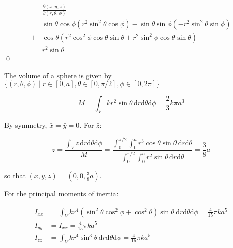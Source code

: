 \documentclass[12pt]{article}
\begin{document}




\begin{equation}
\begin{split}
    &\frac{\partial (x, y, z)}{\partial (r, \theta, \phi)} \\
    =& \sin{\theta} \cos{\phi} (r^{2} \sin^{2}\theta \cos{\phi}) - \sin{\theta} \sin{\phi} (-r^{2} \sin^{2}\theta \sin{\phi}) \\
    +& \cos{\theta} (r^{2} \cos^{2}{\phi} \cos{\theta} \sin{\theta} + r^{2} \sin^{2}{\phi} \cos{\theta} \sin{\theta}) \\
    =& r^{2} \sin{\theta}
\end{split}
\end{equation}
\qed


The volume of a sphere is given by $\{(r, \theta, \phi) \mid r \in [0 ,a], \theta \in [0, \pi/2], \phi \in [0, 2\pi]\}$

\begin{equation}
    M = \int_{V} k r^{2} \sin{\theta} \, \mathrm{d}r \mathrm{d}\theta \mathrm{d}\phi = \frac{2}{3} k \pi a^{3}
\end{equation}

By symmetry, $\bar{x} = \bar{y} = 0$. For $\bar{z}$:

\begin{equation}
    \bar{z} = \frac{\int_{V} z \, \mathrm{d}r \mathrm{d}\theta \mathrm{d}\phi}{M} = \frac{\int_{0}^{\pi/2} \int_{0}^{a} r^{3} \cos{\theta} \sin{\theta} \, \mathrm{d}r \mathrm{d}\theta}{\int_{0}^{\pi/2} \int_{0}^{a} r^{2} \sin{\theta} \, \mathrm{d}r \mathrm{d}\theta} = \frac{3}{8} a
\end{equation}

so that $(\bar{x}, \bar{y}, \bar{z}) = (0, 0, \frac{3}{8} a)$.

For the principal moments of inertia:

\begin{equation}
\begin{split}
    I_{xx} &= \int_{V} k r^{4} (\sin^{2}{\theta} \cos^{2}{\phi} + \cos^{2}{\theta}) \sin{\theta} \, \mathrm{d}r \mathrm{d}\theta \mathrm{d}\phi = \frac{4}{15} \pi k a^{5} \\
    I_{yy} &= I_{xx} = \frac{4}{15} \pi k a^{5} \\
    I_{zz} &= \int_{V} k r^{4} \sin^{3}{\theta} \, \mathrm{d}r \mathrm{d}\theta \mathrm{d}\phi = \frac{4}{15} \pi k a^{5}
\end{split}
\end{equation}
\end{document}
